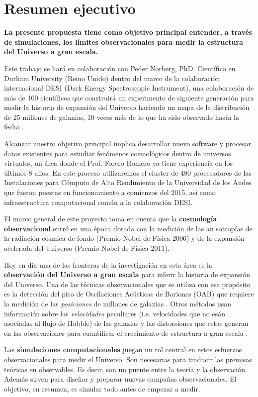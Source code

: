 
\section{Resumen ejecutivo}


{\bf La presente propuesta tiene como objetivo principal entender, a
  trav\'es de simulaciones, los l\'imites observacionales para 
  medir la estructura del Universo a gran escala.}

  Este trabajo se har\'a en colaboraci\'on con  Peder Norberg,
  PhD. Cient\'ifico en Durham University (Reino     Unido) dentro del
  marco de la colaboraci\'on internacional DESI (Dark Energy
  Spectroscopic Instrument), una colaboraci\'on de m\'as de 100
  cient\'ificos que construir\'a un experimento de siguiente
  generaci\'on para medir la historia de expansi\'on del Universo
  haciendo un mapa de la  distribuci\'on de 25 millones de galaxias, 10
  veces m\'as de lo que ha sido observado hasta la fecha \cite{DESI}. 

  
  Alcanzar nuestro objetivo principal implica desarrollar nuevo software
  y procesar datos existentes para estudiar fen\'omenos cosmol\'ogicos 
dentro de universos virtuales, un \'area donde el Prof. Forero Romero
ya tiene experiencia en los \'ultimos 8 a\~nos.
En este proceso utilizaremos el cluster de 480 procesadores de
las Instalaciones para C\'omputo de Alto Rendimiento de  la
Universidad de los Andes que fueron puestas en funcionamiento a
comienzos del 2015, as\'i como infraestructura computacional com\'un a
la colaboraci\'on DESI.

El marco general de este proyecto toma en cuenta que la {\bf
  cosmología observacional} entró en una época dorada con la medición
de las an sotropías de la radiación cósmica de fondo (Premio Nobel de
Física 2006) y de la expansión acelerada del Universo  (Premio Nobel
de Física 2011).    

Hoy en d\'ia una de las fronteras de la investigación en esta \'area 
es la {\bf observaci\'on del Universo a gran escala} para inferir la
historia de expansión  del Universo.   
Una de las t\'ecnicas observacionales que se utiliza con ese
prop\'osito es la detecci\'on del pico de Oscilaciones Ac\'usticas de
Bariones (OAB) que requiere la medici\'on de las \emph{posiciones} de
millones de galaxias \cite{Eisenstein2005}. 
Otros m\'etodos usan informaci\'on sobre las \emph{velocidades}
peculiares (i.e. velocidades que no es\'an asociadas al flujo de
Hubble) de las galaxias y las distorsiones que estas generan en las
observaciones para cuantificar el crecimiento de estructura a gran
escala \cite{Scoccimarro2004}. 

Las {\bf simulaciones computacionales} juegan un rol central en estos 
esfuerzos observacionales para medir el Universo.
Son necesarias para traducir las premisas te\'oricas
en observables. 
Es decir, son un puente entre la teor\'ia y la  observaci\'on. 
Adem\'as sirven para dise\~nar y preparar 
nuevas campa\~nas observacionales.  El objetivo, en resumen, es simular todo antes de empezar a medir. 


